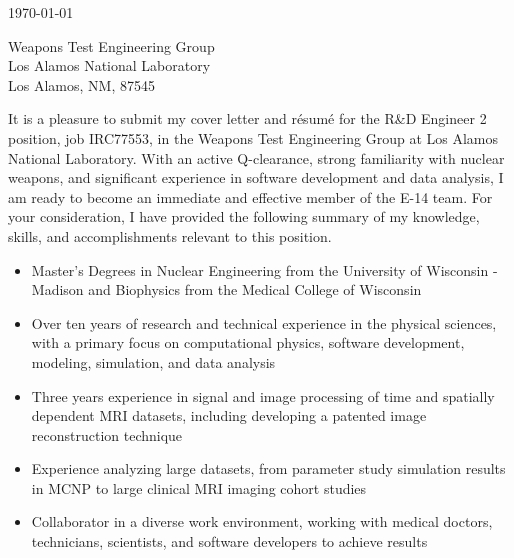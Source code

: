 
\begin{center}
\begin{minipage}{\textwidth}

  \normalsize

  \vspace{6mm} 

  \today \\
  \vspace{4mm}
	
	Weapons Test Engineering Group \\
	Los Alamos National Laboratory \\
	Los Alamos, NM, 87545 \\
  
  \vspace{4mm} 


	It is a pleasure to submit my cover letter and r\'{e}sum\'{e} for the R\&D Engineer 2 position, job IRC77553, in the Weapons Test Engineering Group at Los Alamos National Laboratory.
  With an active Q-clearance, strong familiarity with nuclear weapons, and significant experience in software development and data analysis, I am ready to become an immediate and effective member of the E-14 team.
  For your consideration, I have provided the following summary of my knowledge, skills, and accomplishments relevant to this position. \\

  \begin{itemize}[leftmargin=.45in,rightmargin=.45in,itemsep=1.6mm]

	\item Master's Degrees in Nuclear Engineering from the University of Wisconsin - Madison and Biophysics from the Medical College of Wisconsin
	\item Over ten years of research and technical experience in the physical sciences, with a primary focus on computational physics, software development, modeling, simulation, and data analysis
	\item Three years experience in signal and image processing of time and spatially dependent MRI datasets, including developing a patented image reconstruction technique
	\item Experience analyzing large datasets, from parameter study simulation results in MCNP to large clinical MRI imaging cohort studies %
	\item Collaborator in a diverse work environment, working with medical doctors, technicians, scientists, and software developers to achieve results


\end{itemize}
\end{minipage}
\end{center}

